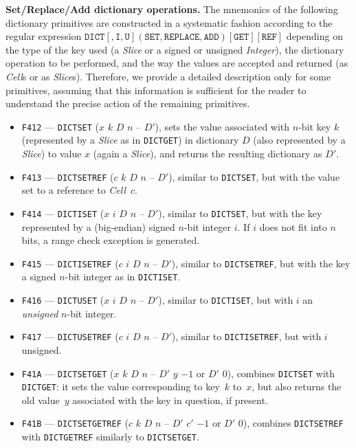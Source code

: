 \documentclass[12pt,oneside]{article}
\def\makepoint#1{\medbreak\noindent{\bf #1.\ }}
\def\nxsubpoint{\refstepcounter{subsubsection}%
    \smallbreak\makepoint{\thesubsubsection}}
\def\emb#1{\textbf{#1.}}
\begin{document}
\nxsubpoint\label{sp:prim.dict.set}\emb{{\sc Set}/{\sc Replace}/{\sc Add} dictionary operations}
The mnemonics of the following dictionary primitives are constructed in a systematic fashion according to the regular expression $\texttt{DICT}[,\texttt{I},\texttt{U}](\texttt{SET},\texttt{REPLACE},\texttt{ADD})[\texttt{GET}][\texttt{REF}]$ depending on the type of the key used (a {\em Slice\/} or a signed or unsigned {\em Integer\/}), the dictionary operation to be performed, and the way the values are accepted and returned (as {\em Cell\/}s or as {\em Slice\/}s). Therefore, we provide a detailed description only for some primitives, assuming that this information is sufficient for the reader to understand the precise action of the remaining primitives.
\begin{itemize}
\item {\tt F412} --- {\tt DICTSET} ($x$ $k$ $D$ $n$ -- $D'$), sets the value associated with $n$-bit key $k$ (represented by a {\em Slice} as in {\tt DICTGET}) in dictionary $D$ (also represented by a {\em Slice}) to value $x$ (again a {\em Slice}), and returns the resulting dictionary as $D'$.
\item {\tt F413} --- {\tt DICTSETREF} ($c$ $k$ $D$ $n$ -- $D'$), similar to {\tt DICTSET}, but with the value set to a reference to {\em Cell}~$c$.
\item {\tt F414} --- {\tt DICTISET} ($x$ $i$ $D$ $n$ -- $D'$), similar to {\tt DICTSET}, but with the key represented by a (big-endian) signed $n$-bit integer $i$. If $i$ does not fit into $n$ bits, a range check exception is generated.
\item {\tt F415} --- {\tt DICTISETREF} ($c$ $i$ $D$ $n$ -- $D'$), similar to {\tt DICTSETREF}, but with the key a signed $n$-bit integer as in {\tt DICTISET}.
\item {\tt F416} --- {\tt DICTUSET} ($x$ $i$ $D$ $n$ -- $D'$), similar to {\tt DICTISET}, but with $i$ an {\em unsigned\/} $n$-bit integer.
\item {\tt F417} --- {\tt DICTUSETREF} ($c$ $i$ $D$ $n$ -- $D'$), similar to {\tt DICTISETREF}, but with $i$ unsigned.
\item {\tt F41A} --- {\tt DICTSETGET} ($x$ $k$ $D$ $n$ -- $D'$ $y$ $-1$ or $D'$ $0$), combines {\tt DICTSET} with {\tt DICTGET}: it sets the value corresponding to key~$k$ to~$x$, but also returns the old value~$y$ associated with the key in question, if present.
\item {\tt F41B} --- {\tt DICTSETGETREF} ($c$ $k$ $D$ $n$ -- $D'$ $c'$ $-1$ or $D'$ $0$), combines {\tt DICTSETREF} with {\tt DICTGETREF} similarly to {\tt DICTSETGET}.

\end{itemize}
\end{document}
